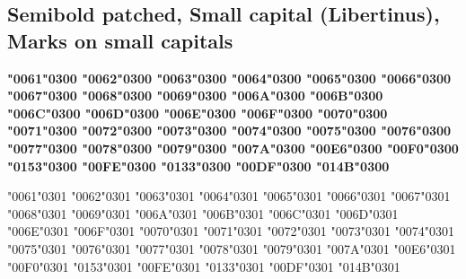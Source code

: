 \newpage
\subsection*{Semibold patched, Small capital (Libertinus), Marks on small capitals}

{\LibertinusSerifPatch\bfseries
\textsc{\char"0061\char"0300} \textsc{\char"0062\char"0300} \textsc{\char"0063\char"0300} \textsc{\char"0064\char"0300} \textsc{\char"0065\char"0300} \textsc{\char"0066\char"0300} \textsc{\char"0067\char"0300} \textsc{\char"0068\char"0300} \textsc{\char"0069\char"0300} \textsc{\char"006A\char"0300} \textsc{\char"006B\char"0300} \textsc{\char"006C\char"0300} \textsc{\char"006D\char"0300} \textsc{\char"006E\char"0300} \textsc{\char"006F\char"0300} \textsc{\char"0070\char"0300} \textsc{\char"0071\char"0300} \textsc{\char"0072\char"0300} \textsc{\char"0073\char"0300} \textsc{\char"0074\char"0300} \textsc{\char"0075\char"0300} \textsc{\char"0076\char"0300} \textsc{\char"0077\char"0300} \textsc{\char"0078\char"0300} \textsc{\char"0079\char"0300} \textsc{\char"007A\char"0300} \textsc{\char"00E6\char"0300} \textsc{\char"00F0\char"0300} \textsc{\char"0153\char"0300} \textsc{\char"00FE\char"0300} \textsc{\char"0133\char"0300} \textsc{\char"00DF\char"0300} \textsc{\char"014B\char"0300}

\textsc{\char"0061\char"0301} \textsc{\char"0062\char"0301} \textsc{\char"0063\char"0301} \textsc{\char"0064\char"0301} \textsc{\char"0065\char"0301} \textsc{\char"0066\char"0301} \textsc{\char"0067\char"0301} \textsc{\char"0068\char"0301} \textsc{\char"0069\char"0301} \textsc{\char"006A\char"0301} \textsc{\char"006B\char"0301} \textsc{\char"006C\char"0301} \textsc{\char"006D\char"0301} \textsc{\char"006E\char"0301} \textsc{\char"006F\char"0301} \textsc{\char"0070\char"0301} \textsc{\char"0071\char"0301} \textsc{\char"0072\char"0301} \textsc{\char"0073\char"0301} \textsc{\char"0074\char"0301} \textsc{\char"0075\char"0301} \textsc{\char"0076\char"0301} \textsc{\char"0077\char"0301} \textsc{\char"0078\char"0301} \textsc{\char"0079\char"0301} \textsc{\char"007A\char"0301} \textsc{\char"00E6\char"0301} \textsc{\char"00F0\char"0301} \textsc{\char"0153\char"0301} \textsc{\char"00FE\char"0301} \textsc{\char"0133\char"0301} \textsc{\char"00DF\char"0301} \textsc{\char"014B\char"0301}

}
